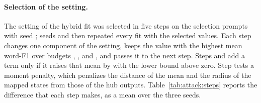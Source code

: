 \paragraph{Selection of the setting.} The setting of the hybrid fit was selected in five steps on the selection prompts with seed ; seeds  and  then repeated every fit with the selected values. %
Each step changes one component of the setting, keeps the value with the highest mean word-F1 over budgets , , and , and passes it to the next step.
Steps  and  add a term only if it raises that mean by  with the lower bound above zero.
Step  tests a moment penalty, which penalizes the distance of the mean and the radius of the mapped states from those of the hub outputs.
Table~\ref{tab:attack:steps} reports the difference that each step makes, as a mean over the three seeds.


